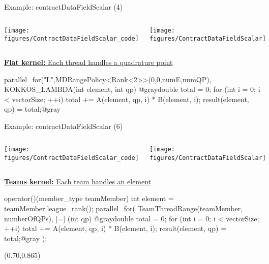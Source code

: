 \begin{frame}[fragile]{Example: contractDataFieldScalar (4)}

  \begin{columns}[t,onlytextwidth]
      \begin{center}
        \texttt{[image: figures/ContractDataFieldScalar\_code]}
      \end{center}
      \begin{center}
        \texttt{[image: figures/ContractDataFieldScalar]}
      \end{center}
  \end{columns}

  \vspace{10pt}

  \ul{\textbf{Flat kernel:} Each thread handles a quadrature point}

  \begin{code}[frame=single, keywords={}]
parallel_for("L",MDRangePolicy<Rank<2>>({0,0},{numE,numQP}),
  KOKKOS_LAMBDA(int element, int qp) {
  @graydouble total = 0;
  for (int i = 0; i < vectorSize; ++i) {
    total += A(element, qp, i) * B(element, i);
  }
  result(element, qp) = total;@gray
}
  \end{code}

\end{frame}


\begin{frame}[fragile]{Example: contractDataFieldScalar (6)}

  \begin{columns}[t,onlytextwidth]
      \begin{center}
        \texttt{[image: figures/ContractDataFieldScalar\_code]}
      \end{center}
      \begin{center}
        \texttt{[image: figures/ContractDataFieldScalar]}
      \end{center}
  \end{columns}

  \vspace{0pt}

  \ul{\textbf{Teams kernel:} Each team handles an element}

  \begin{code}[frame=single, keywords={}]
operator()(member_type teamMember) {
  int element = teamMember.league_rank();
  parallel_for(
    TeamThreadRange(teamMember, numberOfQPs),
    [=] (int qp) {
      @graydouble total = 0;
      for (int i = 0; i < vectorSize; ++i) {
        total += A(element, qp, i) * B(element, i);
      }
      result(element, qp) = total;@gray
    });
}
  \end{code}

  \begin{textblock*}{0.50\textwidth}(0.70\textwidth,0.865\textheight)
  \end{textblock*}
\end{frame}

